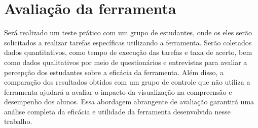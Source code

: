 
\section{Avaliação da ferramenta}
Será realizado um teste prático com um grupo de estudantes, onde os eles serão solicitados a realizar tarefas específicas utilizando a ferramenta. Serão coletados dados quantitativos, como tempo de execução das tarefas e taxa de acerto, bem como dados qualitativos por meio de questionários e entrevistas para avaliar a percepção dos estudantes sobre a eficácia da ferramenta. Além disso, a comparação dos resultados obtidos com um grupo de controle que não utiliza a ferramenta ajudará a avaliar o impacto da visualização na compreensão e desempenho dos alunos. Essa abordagem abrangente de avaliação garantirá uma análise completa da eficácia e utilidade da ferramenta desenvolvida nesse trabalho.


